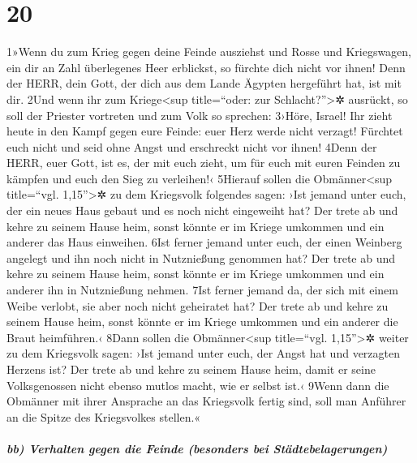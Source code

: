 \hypertarget{section-19}{%
\section{20}\label{section-19}}

1»Wenn du zum Krieg gegen deine Feinde ausziehst und Rosse und
Kriegswagen, ein dir an Zahl überlegenes Heer erblickst, so fürchte dich
nicht vor ihnen! Denn der HERR, dein Gott, der dich aus dem Lande
Ägypten hergeführt hat, ist mit dir. 2Und wenn ihr zum
Kriege\textless sup title=``oder: zur Schlacht?''\textgreater✲ ausrückt,
so soll der Priester vortreten und zum Volk so sprechen: 3›Höre, Israel!
Ihr zieht heute in den Kampf gegen eure Feinde: euer Herz werde nicht
verzagt! Fürchtet euch nicht und seid ohne Angst und erschreckt nicht
vor ihnen! 4Denn der HERR, euer Gott, ist es, der mit euch zieht, um für
euch mit euren Feinden zu kämpfen und euch den Sieg zu verleihen!‹
5Hierauf sollen die Obmänner\textless sup title=``vgl.
1,15''\textgreater✲ zu dem Kriegsvolk folgendes sagen: ›Ist jemand unter
euch, der ein neues Haus gebaut und es noch nicht eingeweiht hat? Der
trete ab und kehre zu seinem Hause heim, sonst könnte er im Kriege
umkommen und ein anderer das Haus einweihen. 6Ist ferner jemand unter
euch, der einen Weinberg angelegt und ihn noch nicht in Nutznießung
genommen hat? Der trete ab und kehre zu seinem Hause heim, sonst könnte
er im Kriege umkommen und ein anderer ihn in Nutznießung nehmen. 7Ist
ferner jemand da, der sich mit einem Weibe verlobt, sie aber noch nicht
geheiratet hat? Der trete ab und kehre zu seinem Hause heim, sonst
könnte er im Kriege umkommen und ein anderer die Braut heimführen.‹
8Dann sollen die Obmänner\textless sup title=``vgl. 1,15''\textgreater✲
weiter zu dem Kriegsvolk sagen: ›Ist jemand unter euch, der Angst hat
und verzagten Herzens ist? Der trete ab und kehre zu seinem Hause heim,
damit er seine Volksgenossen nicht ebenso mutlos macht, wie er selbst
ist.‹ 9Wenn dann die Obmänner mit ihrer Ansprache an das Kriegsvolk
fertig sind, soll man Anführer an die Spitze des Kriegsvolkes stellen.«

\hypertarget{bb-verhalten-gegen-die-feinde-besonders-bei-stuxe4dtebelagerungen}{%
\subparagraph{bb) Verhalten gegen die Feinde (besonders bei
Städtebelagerungen)}\label{bb-verhalten-gegen-die-feinde-besonders-bei-stuxe4dtebelagerungen}}

